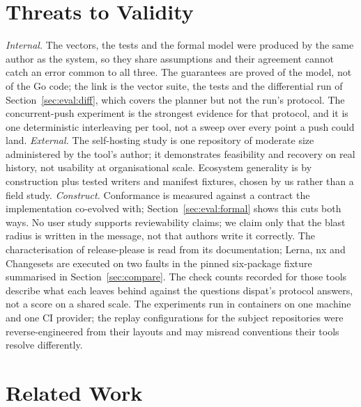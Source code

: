 \documentclass[sigconf,nonacm]{acmart}
\begin{document}
\section{Threats to Validity}
\label{sec:threats}

\emph{Internal.} The vectors, the tests and the formal model were
produced by the same author as the system, so they share assumptions
and their agreement cannot catch an error common to all three.
The guarantees are proved of the model, not of the Go code; the link
is the vector suite, the tests and the differential run of
Section~\ref{sec:eval:diff}, which covers the planner but not the
run's protocol. The concurrent-push experiment is the strongest
evidence for that protocol, and it is one deterministic interleaving
per tool, not a sweep over every point a push could land.
\emph{External.} The self-hosting study is one repository of moderate
size administered by the tool's author; it demonstrates feasibility
and recovery on real history, not usability at organisational scale.
Ecosystem generality is by construction plus tested writers and manifest
fixtures, chosen by us rather than a field study. \emph{Construct.}
Conformance is measured against a
contract the implementation co-evolved with;
Section~\ref{sec:eval:formal} shows this cuts both ways. No user study
supports reviewability claims; we claim only that the blast radius
is written in the message, not that authors write it correctly. The
characterisation of release-please is read from its documentation;
Lerna, nx and Changesets are executed on two faults in the pinned
six-package fixture summarised in Section~\ref{sec:compare}.
The check counts recorded for those tools describe what each leaves
behind against the questions dispat's protocol answers, not a score
on a shared scale. The experiments run in containers on one machine
and one CI provider; the replay configurations for the subject
repositories were reverse-engineered from their layouts and may
misread conventions their tools resolve differently.

\section{Related Work}
\label{sec:related}
\end{document}
